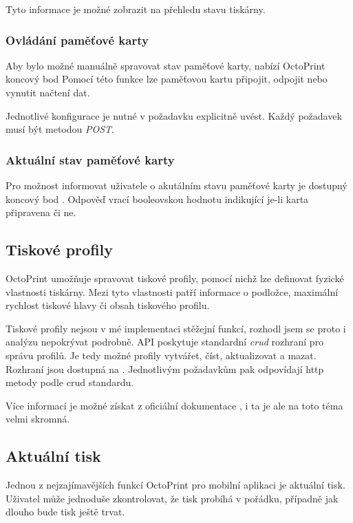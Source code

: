Tyto informace je možné zobrazit na přehledu stavu tiskárny.

\subsubsection*{Ovládání paměťové karty}

Aby bylo možné manuálně spravovat stav paměťové karty, nabízí OctoPrint koncový bod 
Pomocí této funkce lze paměťovou kartu připojit, odpojit nebo vynutit načtení dat.

Jednotlivé konfigurace je nutné v požadavku explicitně uvést.
Každý požadavek musí být metodou \textit{POST}.

\subsubsection*{Aktuální stav paměťové karty}

Pro možnost informovat uživatele o akutálním stavu paměťové karty je dostupný koncový bod .
Odpověď vrací booleovskou hodnotu indikující je-li karta připravena či ne.

\subsection{Tiskové profily}

OctoPrint umožňuje spravovat tiskové profily, pomocí nichž lze definovat fyzické vlastnosti tiskárny.
Mezi tyto vlastnosti patří informace o podložce, maximální rychlost tiskové hlavy či obsah tiskového profilu.

Tiskové profily nejsou v mé implementaci stěžejní funkcí, rozhodl jsem se proto i analýzu nepokrývat podrobně.
API poskytuje standardní \textit{\acrshort{crud}} rozhraní pro správu profilů.
Je tedy možné profily vytvářet, číst, aktualizovat a mazat.
Rozhraní jsou dostupná na .
Jednotlivým požadavkům pak odpovídají \acrshort{http} metody podle \acrshort{crud} standardu.

Více informací je možné získat z oficiální dokumentace \cite{octoprint-docs-printer-profiles}, i ta je ale na toto téma velmi skromná.

\subsection{Aktuální tisk}

Jednou z nejzajímavějších funkcí OctoPrint pro mobilní aplikaci je aktuální tisk.
Uživatel může jednoduše zkontrolovat, že tisk probíhá v pořádku, případně jak dlouho bude tisk ještě trvat.

